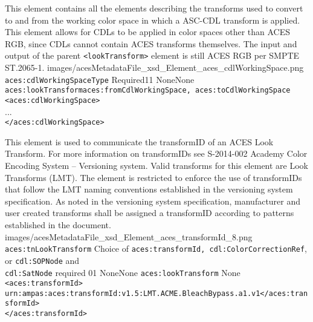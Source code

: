         {This element contains all the elements describing the transforms used to convert to and from the working color space in which a ASC-CDL transform is applied. This element allows for CDLs to be applied in color spaces other than ACES RGB, since CDLs cannot contain ACES transforms themselves. The input and output of the parent \texttt{<lookTransform>} element is still ACES RGB per SMPTE ST.2065-1. }
        {images/acesMetadataFile_xsd_Element_aces_cdlWorkingSpace.png}
        {\texttt{aces:cdlWorkingSpaceType}}
        {Required}{1}{1}
        {None}{None}
        {\texttt{aces:lookTransform}}{\texttt{aces:fromCdlWorkingSpace, aces:toCdlWorkingSpace}}
        {\lstinline{<aces:cdlWorkingSpace>} \\
        ... \\
        \lstinline{</aces:cdlWorkingSpace>}}     
  
        {This element is used to communicate the transformID of an ACES Look Transform.  For more information on transformIDs see S-2014-002 Academy Color Encoding System -- Versioning system.  Valid transforms for this element are Look Transforms (LMT).  The element is restricted to enforce the use of transformIDs that follow the LMT naming conventions established in the versioning system specification.  As noted in the versioning system specification, manufacturer and user created transforms shall be assigned a transformID according to patterns established in the document.}
        {images/acesMetadataFile_xsd_Element_aces_transformId_8.png}
        {\texttt{aces:tnLookTransform}}
        {Choice of \texttt{aces:transformId, cdl:ColorCorrectionRef}, or \texttt{cdl:SOPNode} and \\ \texttt{cdl:SatNode} required}
        {0}{1}
        {None}{None}
        {\texttt{aces:lookTransform}}
        {None}
        {\lstinline{<aces:transformId>}\\
        \lstinline{urn:ampas:aces:transformId:v1.5:LMT.ACME.BleachBypass.a1.v1</aces:transformId>}\\
        \lstinline{</aces:transformId>}
        } 
 
